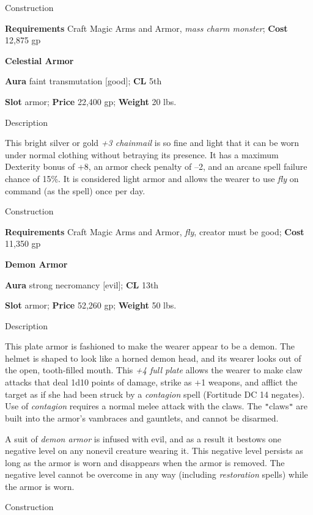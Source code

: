 Construction
				
\textbf{Requirements} Craft Magic Arms and Armor, \textit{mass charm monster}; \textbf{Cost }12,875 gp
				
\textbf{Celestial Armor}
				
\textbf{Aura} faint transmutation \mbox{$[$}good\mbox{$]$}; \textbf{CL} 5th
				
\textbf{Slot} armor; \textbf{Price} 22,400 gp; \textbf{Weight }20 lbs.
				
Description
				
This bright silver or gold \textit{+3 chainmail} is so fine and light that it can be worn under normal clothing without betraying its presence. It has a maximum Dexterity bonus of +8, an armor check penalty of --2, and an arcane spell failure chance of 15\%. It is considered light armor and allows the wearer to use \textit{fly} on command (as the spell) once per day. 
				
Construction
				
\textbf{Requirements} Craft Magic Arms and Armor, \textit{fly}, creator must be good; \textbf{Cost }11,350 gp
				
\textbf{Demon Armor}
				
\textbf{Aura} strong necromancy \mbox{$[$}evil\mbox{$]$}; \textbf{CL} 13th
				
\textbf{Slot} armor; \textbf{Price} 52,260 gp; \textbf{Weight }50 lbs.
				
Description
				
This plate armor is fashioned to make the wearer appear to be a demon. The helmet is shaped to look like a horned demon head, and its wearer looks out of the open, tooth-filled mouth. This \textit{+4 full plate} allows the wearer to make claw attacks that deal 1d10 points of damage, strike as +1 weapons, and afflict the target as if she had been struck by a \textit{contagion} spell (Fortitude DC 14 negates). Use of \textit{contagion} requires a normal melee attack with the claws. The \texttt{{}"{}}claws\texttt{{}"{}} are built into the armor's vambraces and gauntlets, and cannot be disarmed. 
				
A suit of \textit{demon armor} is infused with evil, and as a result it bestows one negative level on any nonevil creature wearing it. This negative level persists as long as the armor is worn and disappears when the armor is removed. The negative level cannot be overcome in any way (including \textit{restoration} spells) while the armor is worn. 
				
Construction
				
